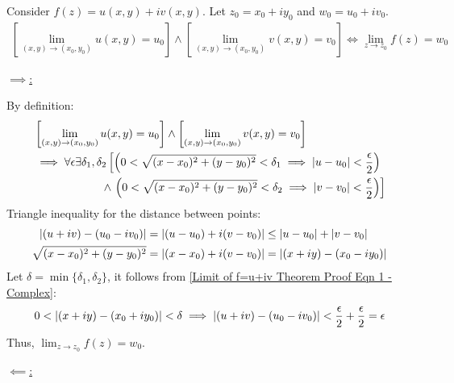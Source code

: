 \documentclass[12pt, english]{book}
\makeatletter
\renewenvironment{proof}[1][\proofname]{\par
	\pushQED{\qed}%
	\normalfont \topsep6\p@\@plus6\p@\relax
	\list{}{%
		\settowidth{\leftmargin}{\itshape\proofname:\hskip\labelsep}%
		\setlength{\labelwidth}{0pt}%
		\setlength{\itemindent}{-\leftmargin}%
		}%
	\item[\hskip\labelsep\itshape#1\@addpunct{:}]\ignorespaces
	}{\popQED\endlist\@endpefalse}
\makeatother
\begin{document}
	\begin{theorem}
		\label{Limit of f=u+iv Theorem - Complex}
		Consider $f(z) = u(x, y) + iv(x,y)$. Let $z_0 = x_0 + iy_0$ and $w_0 = u_0 + iv_0$.
		\begin{align*}
			\left[\lim_{(x,y) \rightarrow (x_0, y_0)} u(x,y) = u_0 \right] \land
			\left[\lim_{(x,y) \rightarrow (x_0, y_0)} v(x,y) = v_0 \right]
			\iff
			\lim_{z \rightarrow z_0} f(z) = w_0
		\end{align*}
	\end{theorem}
	\begin{proof}
		\underline{$\implies$:}
		
		By definition: 
		\begin{align}
			\label{Limit of f=u+iv Theorem Proof Eqn 1 - Complex}
			&\left[\lim_{(x,y) \rightarrow (x_0, y_0)} u(x,y) = u_0 \right] \land
			 \left[\lim_{(x,y) \rightarrow (x_0, y_0)} v(x,y) = v_0 \right] \\ \nonumber
			&\implies \forall \epsilon \exists \delta_1, \delta_2
			 \left[\left(0< \sqrt{(x-x_0)^2 + (y-y_0)^2} < \delta_1 \implies \abs{u-u_0} < \frac{\epsilon}{2}\right) \right.\\ \nonumber
			&\qquad \qquad \qquad \land \left.
			 \left(0< \sqrt{(x-x_0)^2 + (y-y_0)^2} < \delta_2 \implies \abs{v-v_0} < \frac{\epsilon}{2}\right)
			 \right]
		\end{align}
		Triangle inequality for the distance between points:
		\begin{align*}
			\abs{(u+iv) - (u_0 - iv_0)} &= \abs{(u-u_0) + i(v-v_0)} \leq \abs{u-u_0} + \abs{v-v_0} \\
			\sqrt{(x-x_0)^2 + (y-y_0)^2} &= \abs{(x-x_0) + i(v-v_0)} = \abs{(x+iy) - (x_0 - iy_0)}
		\end{align*}
		Let $\delta = \min\{\delta_1, \delta_2\}$, it follows from 
		\cref{Limit of f=u+iv Theorem Proof Eqn 1 - Complex}: 
		$$0 < \abs{(x+iy) - (x_0 + iy_0)} < \delta 
			\implies \abs{(u+iv)-(u_0 - iv_0)} < \frac{\epsilon}{2} + \frac{\epsilon}{2} = \epsilon$$
		Thus, $\lim_{z \rightarrow z_0} f(z) = w_0$.
		
		\underline{$\impliedby$:}
		

\end{proof}
\end{document}
